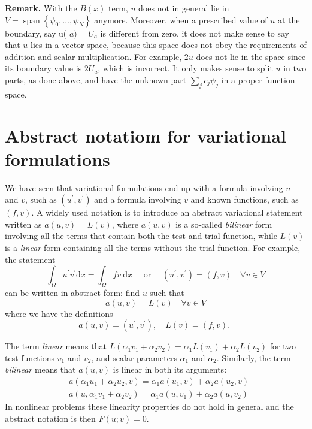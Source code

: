 \documentclass[../main.tex]{subfiles}
\begin{document}
	\noindent \textbf{Remark.   } With the $B(x)$ term, $u$ does not in general lie in $V=\operatorname{span}\left\{\psi_{0}, \ldots, \psi_{N}\right\}$ anymore. Moreover, when a prescribed value of $u$ at the boundary, say u( $a)=U_{a}$ is different from zero, it does not make sense to say that $u$ lies in a vector space, because this space does not obey the requirements of addition and scalar multiplication. For example, $2 u$ does not lie in the space since its boundary value is $2 U_{a}$, which is incorrect. It only makes sense to split $u$ in two parts, as done above, and have the unknown part $\sum_{j} c_{j} \psi_{j}$ in a proper function space.

\section[Abstract notatiom for variational formulations]{Abstract notatiom for variational formulations} 
	\label{sec:sec_11_12}
	\noindent We have seen that variational formulations end up with a formula involving $u$ and $v$, such as $\left(u^{\prime}, v^{\prime}\right)$ and a formula involving $v$ and known functions, such as $(f, v)$. A widely used notation is to introduce an abstract variational statement written as $a(u, v)=L(v)$, where $a(u, v)$ is a so-called \emph{bilinear} form involving all the terms that contain both the test and trial function, while $L(v)$ is a \emph{linear} form containing all the terms without the trial function. For example, the statement
	$$
	\int_{\Omega} u^{\prime} v^{\prime} \mathrm{d} x=\int_{\Omega} f v \mathrm{~d} x \quad \text { or } \quad\left(u^{\prime}, v^{\prime}\right)=(f, v) \quad \forall v \in V
	$$
	can be written in abstract form: find $u$ such that
	$$
	a(u, v)=L(v) \quad \forall v \in V
	$$
	where we have the definitions
	$$
	a(u, v)=\left(u^{\prime}, v^{\prime}\right), \quad L(v)=(f, v) \text {. }
	$$
	
	The term \emph{linear} means that $L\left(\alpha_{1} v_{1}+\alpha_{2} v_{2}\right)=\alpha_{1} L\left(v_{1}\right)+\alpha_{2} L\left(v_{2}\right)$ for two test functions $v_{1}$ and $v_{2}$, and scalar parameters $\alpha_{1}$ and $\alpha_{2}$. Similarly, the term \emph{bilinear} means that $a(u, v)$ is linear in both its arguments:
	$$
	\begin{aligned}
		&a\left(\alpha_{1} u_{1}+\alpha_{2} u_{2}, v\right)=\alpha_{1} a\left(u_{1}, v\right)+\alpha_{2} a\left(u_{2}, v\right) \\
		&a\left(u, \alpha_{1} v_{1}+\alpha_{2} v_{2}\right)=\alpha_{1} a\left(u, v_{1}\right)+\alpha_{2} a\left(u, v_{2}\right)
	\end{aligned}
	$$
	In nonlinear problems these linearity properties do not hold in general and the abstract notation is then $F(u ; v)=0$.
	
\end{document}

